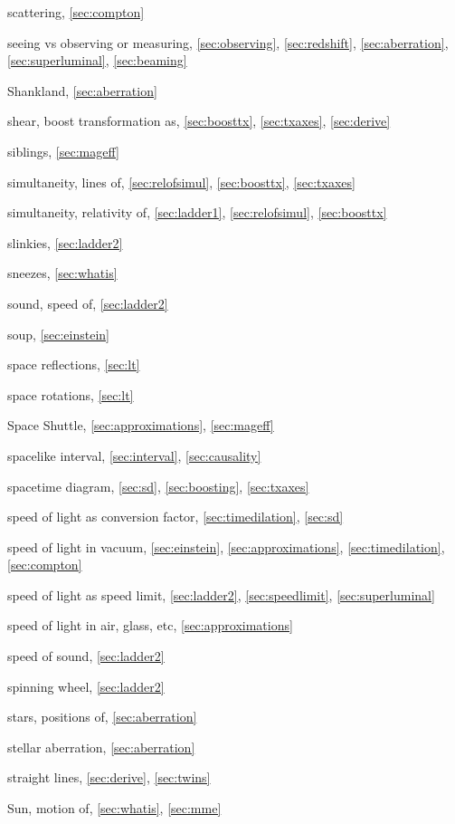 \begin{theindex}
\item scattering, \ref{sec:compton}
\item seeing vs observing or measuring, \ref{sec:observing},
	\ref{sec:redshift}, \ref{sec:aberration}, \ref{sec:superluminal},
	\ref{sec:beaming}
\item Shankland, \ref{sec:aberration}
\item shear, boost transformation as, \ref{sec:boosttx}, \ref{sec:txaxes},
	\ref{sec:derive}
\item siblings, \ref{sec:mageff}
\item simultaneity, lines of, \ref{sec:relofsimul}, \ref{sec:boosttx},
	\ref{sec:txaxes}
\item simultaneity, relativity of, \ref{sec:ladder1}, \ref{sec:relofsimul},
	\ref{sec:boosttx}
\item slinkies, \ref{sec:ladder2}
\item sneezes, \ref{sec:whatis}
\item sound, speed of, \ref{sec:ladder2}
\item soup, \ref{sec:einstein}
\item space reflections, \ref{sec:lt}
\item space rotations, \ref{sec:lt}
\item Space Shuttle, \ref{sec:approximations}, \ref{sec:mageff}
\item spacelike interval, \ref{sec:interval}, \ref{sec:causality}
\item spacetime diagram, \ref{sec:sd}, \ref{sec:boosting}, \ref{sec:txaxes}
\item speed of light as conversion factor, \ref{sec:timedilation},
	\ref{sec:sd}
\item speed of light in vacuum, \ref{sec:einstein}, \ref{sec:approximations},
	\ref{sec:timedilation}, \ref{sec:compton}
\item speed of light as speed limit, \ref{sec:ladder2}, \ref{sec:speedlimit},
	\ref{sec:superluminal}
\item speed of light in air, glass, etc, \ref{sec:approximations}
\item speed of sound, \ref{sec:ladder2}
\item spinning wheel, \ref{sec:ladder2}
\item stars, positions of, \ref{sec:aberration}
\item stellar aberration, \ref{sec:aberration}
\item straight lines, \ref{sec:derive}, \ref{sec:twins}
\item Sun, motion of, \ref{sec:whatis}, \ref{sec:mme}

\end{theindex}
